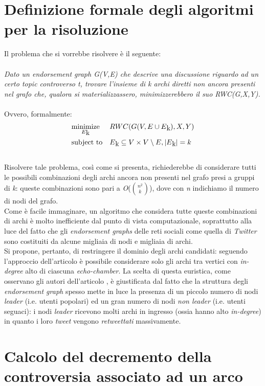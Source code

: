 \section{Definizione formale degli algoritmi per la risoluzione}
Il problema che si vorrebbe risolvere è il seguente: 
\\\\
\textit{Dato un endorsement graph G(V,E) che descrive una discussione riguardo ad un certo topic controverso t, trovare l'insieme di k archi diretti non ancora presenti nel grafo che, qualora si materializzassero, minimizzerebbero il suo RWC(G,X,Y).}
\\\\
Ovvero, formalmente:
\\
\begin{equation*}
\begin{aligned}
& \underset{E\textsubscript{k}}{\text{minimize}}
& & RWC(G(V, E \cup E\textsubscript{k}),X,Y) \\
& \text{subject to}
& & E\textsubscript{k} \subseteq V \times V \setminus E, \left|{E\textsubscript{k}}\right| = k
\end{aligned}
\end{equation*}
\\
Risolvere tale problema, così come si presenta, richiederebbe di considerare tutti le possibili combinazioni degli archi ancora non presenti nel grafo presi a gruppi di \textit{k}: queste combinazioni sono pari a \textit{O}($n^2 \choose k$), dove con \textit{n} indichiamo il numero di nodi del grafo.
\\Come è facile immaginare, un algoritmo che considera tutte queste combinazioni di archi è molto inefficiente dal punto di vista computazionale, soprattutto alla luce del fatto che gli \textit{endorsement graphs} delle reti sociali come quella di \textit{Twitter} sono costituiti da alcune migliaia di nodi e migliaia di archi.
\\Si propone, pertanto, di restringere il dominio degli archi candidati: seguendo l'approccio dell'articolo \cite{garimella:paper} è possibile considerare solo gli archi tra vertici con \textit{in-degree} alto di ciascuna \textit{echo-chamber}. La scelta di questa euristica, come osservano gli autori dell'articolo \cite{garimella:paper}, è giustificata dal fatto che la struttura degli \textit{endorsement graph} spesso mette in luce la presenza di un piccolo numero di nodi \textit{leader} (i.e. utenti popolari) ed un gran numero di nodi \textit{non leader} (i.e. utenti seguaci): i nodi \textit{leader} ricevono molti archi in ingresso (ossia hanno alto \textit{in-degree}) in quanto i loro \textit{tweet} vengono \textit{retweettati} massivamente. 



\section{Calcolo del decremento della controversia associato ad un arco}
